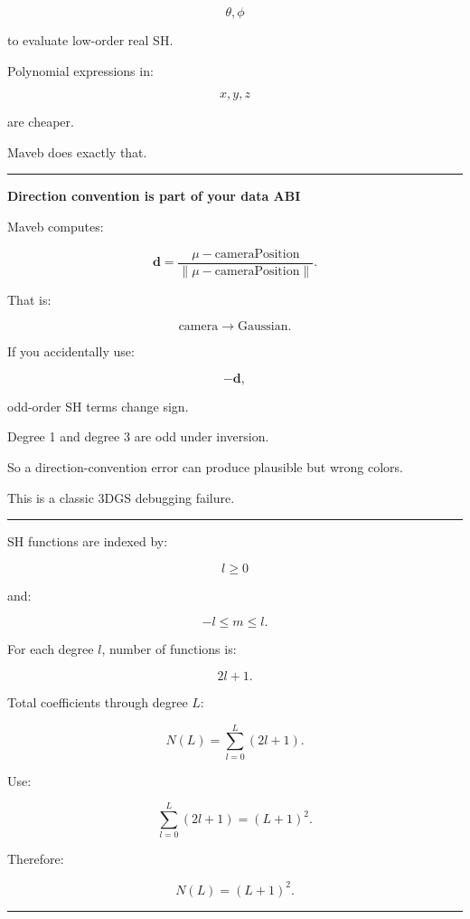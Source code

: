 \[
\theta,\phi
\]

to evaluate low-order real SH.

Polynomial expressions in:

\[
x,y,z
\]

are cheaper.

Maveb does exactly that.

\begin{center}\rule{0.5\linewidth}{0.5pt}\end{center}

\textbf{Direction convention is part of your data ABI}

Maveb computes:

\[
\mathbf d
=
\frac{
\mu-\text{cameraPosition}
}{
\|\mu-\text{cameraPosition}\|
}.
\]

That is:

\[
\boxed{
\text{camera}\rightarrow\text{Gaussian}.
}
\]

If you accidentally use:

\[
-\mathbf d,
\]

odd-order SH terms change sign.

Degree 1 and degree 3 are odd under inversion.

So a direction-convention error can produce plausible but wrong colors.

This is a classic 3DGS debugging failure.

\begin{center}\rule{0.5\linewidth}{0.5pt}\end{center}

SH functions are indexed by:

\[
l\ge0
\]

and:

\[
-l\le m\le l.
\]

For each degree \(l\), number of functions is:

\[
2l+1.
\]

Total coefficients through degree \(L\):

\[
N(L)
=
\sum_{l=0}^{L}
(2l+1).
\]

Use:

\[
\sum_{l=0}^{L}(2l+1)
=
(L+1)^2.
\]

Therefore:

\[
\boxed{
N(L)=(L+1)^2.
}
\]

\begin{center}\rule{0.5\linewidth}{0.5pt}\end{center}

